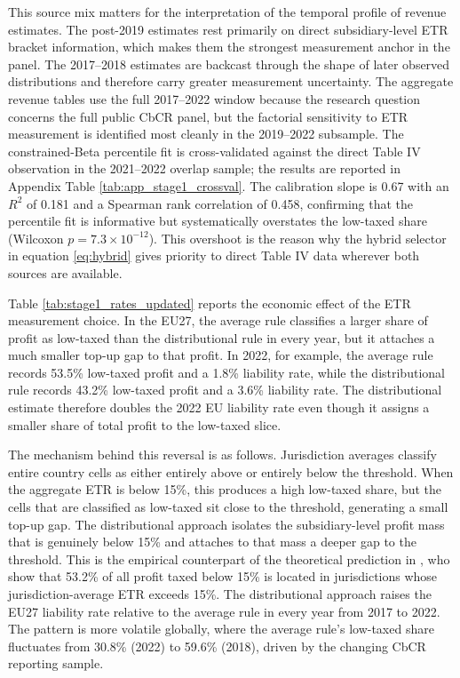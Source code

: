 \documentclass[11pt,a4paper]{article}
\begin{document}
This source mix matters for the interpretation of the temporal profile of revenue estimates. The post-2019 estimates rest primarily on direct subsidiary-level ETR bracket information, which makes them the strongest measurement anchor in the panel. The 2017--2018 estimates are backcast through the shape of later observed distributions and therefore carry greater measurement uncertainty. The aggregate revenue tables use the full 2017--2022 window because the research question concerns the full public CbCR panel, but the factorial sensitivity to ETR measurement is identified most cleanly in the 2019--2022 subsample. The constrained-Beta percentile fit is cross-validated against the direct Table IV observation in the 2021--2022 overlap sample; the results are reported in Appendix Table \ref{tab:app_stage1_crossval}. The calibration slope is 0.67 with an $R^2$ of 0.181 and a Spearman rank correlation of 0.458, confirming that the percentile fit is informative but systematically overstates the low-taxed share (Wilcoxon $p = 7.3 \times 10^{-12}$). This overshoot is the reason why the hybrid selector in equation \eqref{eq:hybrid} gives priority to direct Table IV data wherever both sources are available.





Table \ref{tab:stage1_rates_updated} reports the economic effect of the ETR measurement choice. In the EU27, the average rule classifies a larger share of profit as low-taxed than the distributional rule in every year, but it attaches a much smaller top-up gap to that profit. In 2022, for example, the average rule records 53.5\% low-taxed profit and a 1.8\% liability rate, while the distributional rule records 43.2\% low-taxed profit and a 3.6\% liability rate. The distributional estimate therefore doubles the 2022 EU liability rate even though it assigns a smaller share of total profit to the low-taxed slice.

The mechanism behind this reversal is as follows. Jurisdiction averages classify entire country cells as either entirely above or entirely below the threshold. When the aggregate ETR is below 15\%, this produces a high low-taxed share, but the cells that are classified as low-taxed sit close to the threshold, generating a small top-up gap. The distributional approach isolates the subsidiary-level profit mass that is genuinely below 15\% and attaches to that mass a deeper gap to the threshold. This is the empirical counterpart of the theoretical prediction in \citet{hugger2026}, who show that 53.2\% of all profit taxed below 15\% is located in jurisdictions whose jurisdiction-average ETR exceeds 15\%. The distributional approach raises the EU27 liability rate relative to the average rule in every year from 2017 to 2022. The pattern is more volatile globally, where the average rule's low-taxed share fluctuates from 30.8\% (2022) to 59.6\% (2018), driven by the changing CbCR reporting sample.
\end{document}
